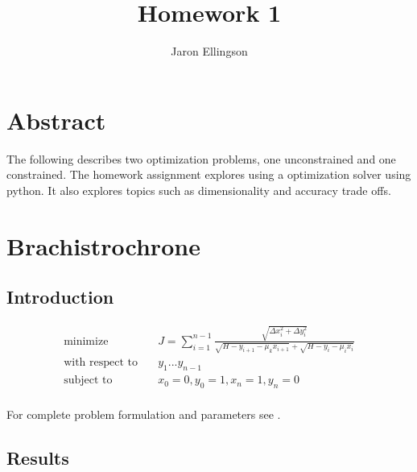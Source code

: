 \documentclass{article}
\begin{document}
\title{Homework 1}
\author{Jaron Ellingson}
\maketitle

\section*{Abstract}

The following describes two optimization problems, one unconstrained and one constrained. The homework assignment explores using a optimization solver using python. It also explores topics such as dimensionality and accuracy trade offs.

\section{Brachistrochrone}

\subsection{Introduction}

\begin{equation}
\begin{aligned}
\text{minimize} & \quad J=\sum_{i=1}^{n-1} \frac{\sqrt{\Delta x_i^2+\Delta y_i^2}}{\sqrt{H-y_{i+1}-\mu_{k}x_{i+1}} + \sqrt{H-y_i-\mu_i x_i} } \\
\text{with respect to} & \quad y_1 ... y_{n-1} \\
\text{subject to} & \quad x_0=0, y_0=1, x_n=1, y_n=0  \\
\end{aligned}
\end{equation}

For complete problem formulation and parameters see \cite{ning}.

\subsection{Results}


\end{document}
